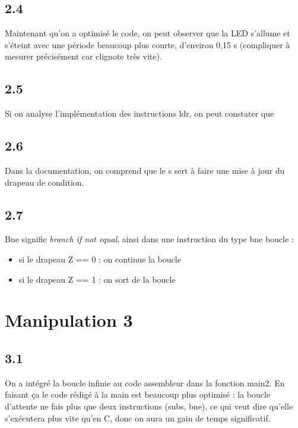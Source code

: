 \documentclass[a4paper,12pt,notitlepage,oneside]{article}
\begin{document}
\subsection*{2.4}

Maintenant qu'on a optimisé le code, on peut observer que la LED s'allume et s'éteint avec une période beaucoup plus courte, d'environ 0,15 s (compliquer à mesurer précisément car clignote très vite). 

\subsection*{2.5}

Si on analyse l'implémentation des instructions ldr, on peut constater que 

\subsection*{2.6}

Dans la documentation, on comprend que le s sert à faire une mise à jour du drapeau de condition. 

\subsection*{2.7}

Bne signifie \textit{branch if not equal}, ainsi dans une instruction du type bne boucle : 

\begin{itemize}
   \item si le drapeau Z == 0 : on continue la boucle
   \item si le drapeau Z == 1 : on sort de la boucle
\end{itemize}


\vspace{1cm}


\section{Manipulation 3}

\subsection*{3.1}

On a intégré la boucle infinie au code assembleur dans la fonction main2.
En faisant ça le code rédigé à la main est beaucoup plus optimisé : la boucle d'attente ne fais plus que deux instructions (subs, bne), ce qui veut dire qu'elle s'exécutera plus vite qu'en C, donc on aura un gain de temps significatif. 
\end{document}
